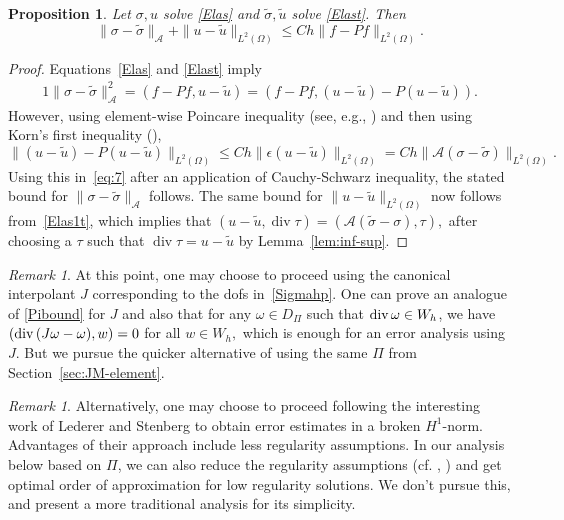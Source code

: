 \documentclass[12pt]{amsart}
\numberwithin{equation}{section}
\newtheorem{proposition}[theorem]{Proposition}
\theoremstyle{definition}
\theoremstyle{remark}
\newtheorem{remark}[theorem]{Remark}
\newcommand{\om}{{\Omega}}
\renewcommand{\(}{\bigl(}
\renewcommand{\)}{\bigr)}
\renewcommand\div{\operatorname{div}}
\newcommand{\tsigma}{\tilde{\sigma}}
\newcommand{\tu}{\tilde{u}}
\newcommand{\dive}{{\ensuremath\mathop{\mathrm{div}\,}}} %
\newcommand{\Aa}{\mathcal{A}}
\newcommand{\PPi}{J} %
\newcommand{\revj}[1]{{\color{black}#1}}
\begin{document}


\begin{proposition}\label{prop142}
  Let $\sigma, u$ solve \eqref{Elas} and $\tsigma, \tu$ solve
  \eqref{Elast}. Then
\begin{equation}
\|\sigma-\tsigma\|_{\Aa}+\| u-\tu\|_{L^2(\Omega)}  \le C h \|f-Pf\|_{L^2(\Omega)}.
\end{equation}
\end{proposition}
\begin{proof}
  Equations~\eqref{Elas} and \eqref{Elast} imply
  \begin{alignat}{1}
    \label{eq:7}
 \|\sigma-\tsigma\|_{\Aa}^2=(f-Pf, u-\tu)= (f-Pf, (u-\tu)-P(u-\tu)) . 
\end{alignat}
However, using element-wise Poincare inequality (see, e.g., \cite{Bebendorf-poincare}) and then using Korn's first inequality (\cite[Theorem~6.3-4]{Ciarlet:elasticity-1}),
\begin{equation*}
\|(u-\tu)-P(u-\tu) \|_{L^2(\Omega)}\le C h \| \epsilon(u-\tu)\|_{L^2(\Omega)} = C h \|\Aa(\sigma-\tsigma) \|_{L^2(\Omega)}.
\end{equation*}
Using this in~\eqref{eq:7} after an application of Cauchy-Schwarz
inequality, the stated bound for $\|\sigma-\tsigma\|_{\Aa}$ follows.
The same bound for $\|u - \tu\|_{L^2(\om)}$ now follows from~\eqref{Elas1t}, which implies that $ (u - \tu, \div \tau) = (\Aa (\tsigma - \sigma), \tau ),$ after choosing a $\tau$ such that $\div \tau=  u - \tu$ by  Lemma~\ref{lem:inf-sup}.
\end{proof}

\begin{remark}
At this point, one may choose to proceed using the canonical
interpolant $J$ corresponding to the dofs in~\eqref{Sigmahp}. One can prove an analogue of \eqref{Pibound}
for $J$ and also that for any $\omega \in D_\Pi$ such that
$\dive \omega \in W_h$, we have $ (\dive( \PPi \omega -\omega), w) =0$
for all $w\in W_h,$  which is enough for an error analysis using $J$.
But we pursue the quicker alternative of using the same $\Pi$ from Section~\ref{sec:JM-element}.  
\end{remark}


\begin{remark}
\revj{Alternatively, one may choose to proceed following the interesting work of Lederer and Stenberg  \cite{Stenberg-2023} to obtain error estimates in a broken $H^1$-norm.  Advantages of their approach include less regularity assumptions. In our analysis below based on $\Pi$, we can also reduce the regularity assumptions (cf. \cite[Theorem~4.8]{Amrouche-etal:1998}, \cite[p.125]{Brezzi-Fortin:1991}) and get optimal order of approximation for low regularity solutions. We don't pursue this, and present a more traditional analysis for its simplicity. %
}  
\end{remark}
\end{document}
